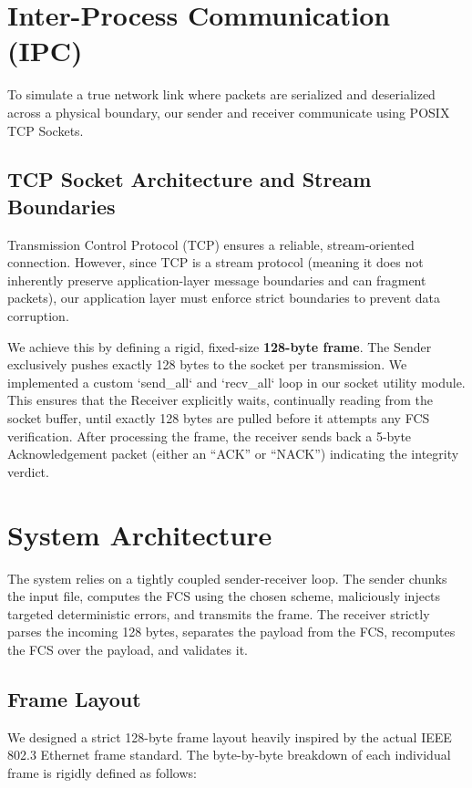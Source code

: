 \documentclass[12pt, a4paper]{article}
\begin{document}
\section{Inter-Process Communication (IPC)}
To simulate a true network link where packets are serialized and deserialized across a physical boundary, our sender and receiver communicate using POSIX TCP Sockets. 

\subsection{TCP Socket Architecture and Stream Boundaries}
Transmission Control Protocol (TCP) ensures a reliable, stream-oriented connection. However, since TCP is a stream protocol (meaning it does not inherently preserve application-layer message boundaries and can fragment packets), our application layer must enforce strict boundaries to prevent data corruption. 

We achieve this by defining a rigid, fixed-size \textbf{128-byte frame}. The Sender exclusively pushes exactly 128 bytes to the socket per transmission. We implemented a custom `send\_all` and `recv\_all` loop in our socket utility module. This ensures that the Receiver explicitly waits, continually reading from the socket buffer, until exactly 128 bytes are pulled before it attempts any FCS verification. After processing the frame, the receiver sends back a 5-byte Acknowledgement packet (either an ``ACK'' or ``NACK'') indicating the integrity verdict.

\section{System Architecture}

The system relies on a tightly coupled sender-receiver loop. The sender chunks the input file, computes the FCS using the chosen scheme, maliciously injects targeted deterministic errors, and transmits the frame. The receiver strictly parses the incoming 128 bytes, separates the payload from the FCS, recomputes the FCS over the payload, and validates it.

\subsection{Frame Layout}
We designed a strict 128-byte frame layout heavily inspired by the actual IEEE 802.3 Ethernet frame standard. The byte-by-byte breakdown of each individual frame is rigidly defined as follows:
\end{document}
